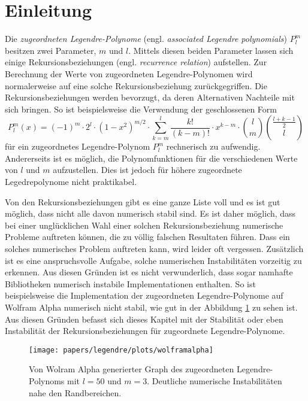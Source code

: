 %
%
%
\section{Einleitung\label{legendre:section:einleitung}}
Die {\em zugeordneten Legendre-Polynome} (engl. {\em associated Legendre polynomials}) $P^m_l$ besitzen zwei Parameter, $m$ und $l$.
%
Mittels diesen beiden Parameter lassen sich einige Rekursionsbeziehungen (engl. {\em recurrence relation}) aufstellen.
Zur Berechnung der Werte von zugeordneten Legendre-Polynomen wird normalerweise auf eine solche Rekursionsbeziehung zurückgegriffen.
Die Rekursionsbeziehungen werden bevorzugt, da deren Alternativen Nachteile mit sich bringen.
So ist beispielsweise die Verwendung der geschlossenen Form
\begin{equation}
P^{m}_{l}(x)
=
(-1)^m \cdot 2^l \cdot (1-x^2)^{m/2}
\cdot \sum_{k=m}^{l} \frac{k!}{(k-m)!} \cdot x^{k-m}
\cdot \binom{l}{m} \binom{\frac{l+k-1}{2}}{l}
\label{legendre:geschlosseneform}
\end{equation}
für ein zugeordnetes Legendre-Polynom $P^m_l$ rechnerisch zu aufwendig.
Andererseits ist es möglich, die Polynomfunktionen für die verschiedenen Werte von $l$ und $m$ aufzustellen.
Dies ist jedoch für höhere zugeordnete Legedrepolynome nicht praktikabel.

Von den Rekursionsbeziehungen gibt es eine ganze Liste voll und es ist gut möglich, dass nicht alle davon numerisch stabil sind.
Es ist daher möglich, dass bei einer unglücklichen Wahl einer solchen Rekursionsbeziehung numerische Probleme auftreten können, die zu völlig falschen Resultaten führen.
Dass ein solches numerisches Problem auftreten kann, wird leider oft vergessen.
Zusätzlich ist es eine anspruchsvolle Aufgabe, solche numerischen Instabilitäten vorzeitig zu erkennen.
Aus diesen Gründen ist es nicht verwunderlich, dass sogar namhafte Bibliotheken numerisch instabile Implementationen enthalten.
So ist beispielsweise die Implementation der zugeordneten Legendre-Polynome auf Wolfram Alpha \cite{legendre:wolfram-alpha} numerisch nicht stabil, wie gut in der Abbildung \ref{legendre:fig:wolframalpha} zu sehen ist.
%
Aus diesen Gründen befasst sich dieses Kapitel mit der Stabilität oder eben Instabilität der Rekursionsbeziehungen für zugeordnete Legendre-Polynome.
%
%

\begin{figure}[!ht]
\centering
\texttt{[image: papers/legendre/plots/wolframalpha]}
\caption{Von Wolram Alpha \cite{legendre:wolfram-alpha} generierter Graph des zugeordneten Legendre-Polynoms mit \texorpdfstring{$l=50$}{l=50} und \texorpdfstring{$m=3$}{m=3}. Deutliche numerische Instabilitäten nahe den Randbereichen.}
\label{legendre:fig:wolframalpha}
\end{figure}
